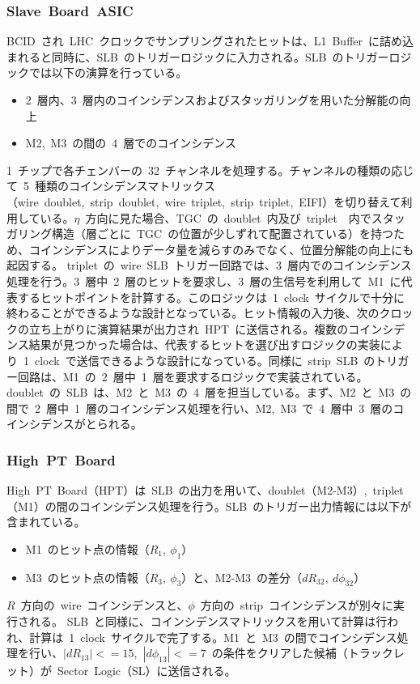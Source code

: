 \subsubsection{Slave~Board~ASIC}
BCID~され~LHC~クロックでサンプリングされたヒットは、L1~Buffer~に詰め込まれると同時に、SLB~のトリガーロジックに入力される。SLB~のトリガーロジックでは以下の演算を行っている。
\begin{itemize}
\item 2~層内、3~層内のコインシデンスおよびスタッガリングを用いた分解能の向上
\item M2,~M3~の間の~4~層でのコインシデンス
\end{itemize}
1~チップで各チェンバーの~32~チャンネルを処理する。チャンネルの種類の応じて~5~種類のコインシデンスマトリックス（wire~doublet,~strip~doublet,~wire~triplet,~strip~triplet,~EIFI）を切り替えて利用している。$\eta$~方向に見た場合、TGC~の~doublet~内及び~triplet~~内でスタッガリング構造（層ごとに~TGC~の位置が少しずれて配置されている）を持つため、コインシデンスによりデータ量を減らすのみでなく、位置分解能の向上にも起因する。
triplet~の~wire~SLB~トリガー回路では、3~層内でのコインシデンス処理を行う。3~層中~2~層のヒットを要求し、3~層の生信号を利用して~M1~に代表するヒットポイントを計算する。このロジックは~1~clock~サイクルで十分に終わることができるような設計となっている。ヒット情報の入力後、次のクロックの立ち上がりに演算結果が出力され~HPT~に送信される。複数のコインシデンス結果が見つかった場合は、代表するヒットを選び出すロジックの実装により~1~clock~で送信できるような設計になっている。同様に~strip~SLB~のトリガー回路は、M1~の~2~層中~1~層を要求するロジックで実装されている。
doublet~の~SLB~は、M2~と~M3~の~4~層を担当している。まず、M2~と~M3~の間で~2~層中~1~層のコインシデンス処理を行い、M2,~M3~で~4~層中~3~層のコインシデンスがとられる。

\subsubsection{High~PT~Board}
High~PT~Board（HPT）は~SLB~の出力を用いて、doublet（M2-M3）,~triplet（M1）の間のコインシデンス処理を行う。SLB~のトリガー出力情報には以下が含まれている。
\begin{itemize}
\item M1~のヒット点の情報（$R_1,~\phi_1$）
\item M3~のヒット点の情報（$R_3,~\phi_3$）と、M2-M3~の差分（$dR_{32},~d\phi_{32}$）
\end{itemize}
$R$~方向の~wire~コインシデンスと、$\phi$~方向の~strip~コインシデンスが別々に実行される。
SLB~と同様に、コインシデンスマトリックスを用いて計算は行われ、計算は~1~clock~サイクルで完了する。M1~と~M3~の間でコインシデンス処理を行い、$|dR_{13}|<=15$,~$|d\phi_{13}|<=7$~の条件をクリアした候補（トラックレット）が~Sector~Logic（SL）に送信される。
